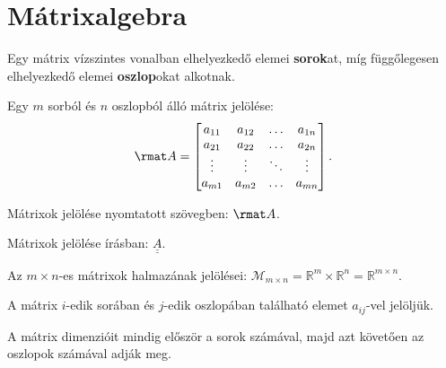 \clearpage
\section{Mátrixalgebra}\label{sec-01-02}

\begin{definition}[Mátrix]
  Egy mátrix vízszintes vonalban elhelyezkedő elemei \textbf{sorok}at,
  míg függőlegesen elhelyezkedő elemei \textbf{oszlop}okat alkotnak.

  Egy $m$ sorból és $n$ oszlopból álló mátrix jelölése:
  $$
    \rmat A = \begin{bmatrix}
      a_{11} & a_{12} & \ldots & a_{1n} \\
      a_{21} & a_{22} & \ldots & a_{2n} \\
      \vdots & \vdots & \ddots & \vdots \\
      a_{m1} & a_{m2} & \ldots & a_{mn}
    \end{bmatrix}
    \text.
  $$

  Mátrixok jelölése nyomtatott szövegben: $\rmat A$.

  Mátrixok jelölése írásban: $\underline{\underline A}$.

  Az $m \times n$-es mátrixok halmazának jelölései: $\mathcal M_{m \times n}
    = \mathbb R^m \times \mathbb R^n = \mathbb R^{m \times n}$.

  A mátrix $i$-edik sorában és $j$-edik oszlopában található elemet
  $a_{ij}$-vel jelöljük.
\end{definition}

\begin{note}
  A mátrix dimenzióit mindig először a sorok számával, majd azt követően az
  oszlopok számával adják meg.
\end{note}

